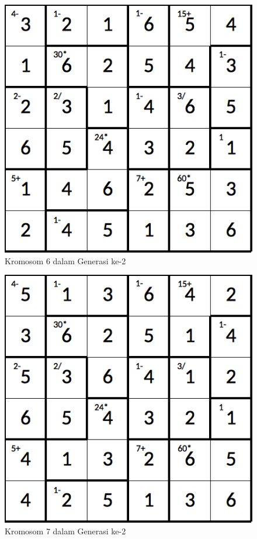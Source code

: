 \begin{figure}
\centering
\captionsetup{justification=centering}
\includegraphics[scale=0.333]{Gambar/hybridgenetic/Generation2Chromosome6}
\caption[Kromosom 6 dalam Generasi ke-2]{Kromosom 6 dalam Generasi ke-2}
\label{fig:analisisg2k6}
\end{figure}

\begin{figure}
\centering
\captionsetup{justification=centering}
\includegraphics[scale=0.333]{Gambar/hybridgenetic/Generation2Chromosome7}
\caption[Kromosom 7 dalam Generasi ke-2]{Kromosom 7 dalam Generasi ke-2}
\label{fig:analisisg2k7}
\end{figure}

